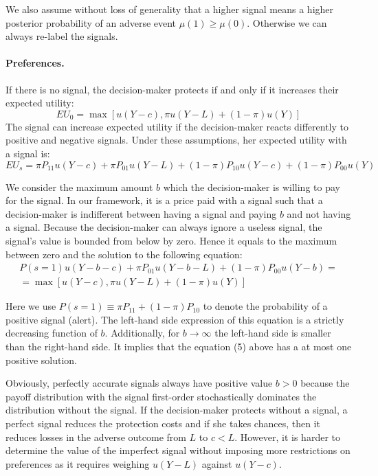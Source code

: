\documentclass[12pt,a4paper]{article}
\begin{document}
We also assume without loss of generality that a higher signal means a higher posterior probability of an adverse event $\mu(1)\geq\mu(0)$. Otherwise we can always re-label the signals.

\vspace{10pt}
\paragraph{Preferences.} If there is no signal, the decision-maker protects if and only if it increases their expected utility:
\begin{equation}
EU_0=\max[u(Y-c),\pi u(Y-L)+(1-\pi) u(Y)]
\end{equation}
The signal can increase expected utility if the decision-maker reacts differently to positive and negative signals. Under these assumptions, her expected utility with a signal is:
\begin{equation}
EU_s=\pi P_{11}u(Y-c)+\pi P_{01}u(Y-L)+(1-\pi)P_{10}u(Y-c)+(1-\pi)P_{00}u(Y)
\end{equation}

We consider the maximum amount $b$ which the decision-maker is willing to pay for the signal. In our framework, it is a price paid with a signal such that a decision-maker is indifferent between having a signal and paying $b$ and not having a signal. Because the decision-maker can always ignore a useless signal, the signal's value is bounded from below by zero. Hence it equals to the maximum between zero and the solution to the following equation:
\begin{equation}
\begin{split}
P(s=1)u(Y-b-c)+\pi P_{01}u(Y-b-L)+(1-\pi)P_{00}u(Y-b)=\\=\max[u(Y-c),\pi u(Y-L)+(1-\pi) u(Y)] 
\end{split}
\end{equation}

Here we use $P(s=1)\equiv \pi P_{11}+(1-\pi)P_{10}$ to denote the probability of a positive signal (alert). The left-hand side expression of this equation is a strictly decreasing function of $b$. Additionally, for $b\rightarrow \infty$ the left-hand side is smaller than the right-hand side. It implies that the equation (5) above has a at most one positive solution.

Obviously, perfectly accurate signals always have positive value $b>0$ because the payoff distribution with the signal first-order stochastically dominates the distribution without the signal. If the decision-maker protects without a signal, a perfect signal reduces the protection costs and if she takes chances, then it reduces losses in the adverse outcome from $L$ to $c<L$.  However, it is harder to determine the value of the imperfect signal without imposing more restrictions on preferences as it requires weighing $u(Y-L)$ against $u(Y-c)$.
\end{document}
